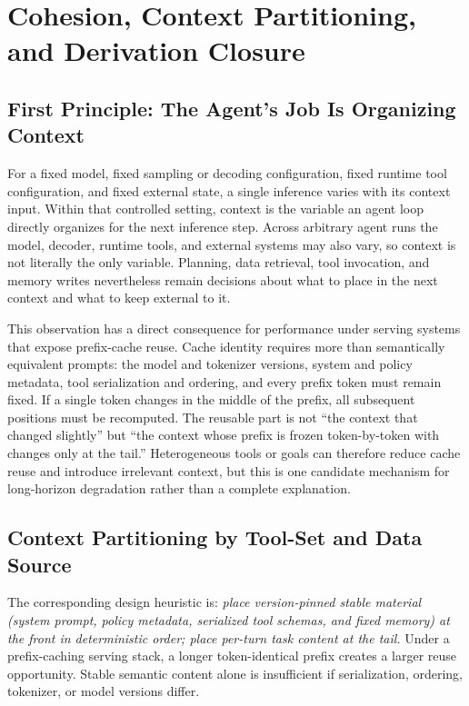 \section{Cohesion, Context Partitioning, and Derivation Closure}
\label{sec:cohesion}

\subsection{First Principle: The Agent's Job Is Organizing Context}
\label{sec:first-principle}

For a fixed model, fixed sampling or decoding configuration, fixed runtime tool configuration, and fixed external state, a single inference varies with its context input. Within that controlled setting, context is the variable an agent loop directly organizes for the next inference step. Across arbitrary agent runs the model, decoder, runtime tools, and external systems may also vary, so context is not literally the only variable. Planning, data retrieval, tool invocation, and memory writes nevertheless remain decisions about what to place in the next context and what to keep external to it.

This observation has a direct consequence for performance under serving systems that expose prefix-cache reuse. Cache identity requires more than semantically equivalent prompts: the model and tokenizer versions, system and policy metadata, tool serialization and ordering, and every prefix token must remain fixed. If a single token changes in the middle of the prefix, all subsequent positions must be recomputed. The reusable part is not ``the context that changed slightly'' but ``the context whose prefix is frozen token-by-token with changes only at the tail.'' Heterogeneous tools or goals can therefore reduce cache reuse and introduce irrelevant context, but this is one candidate mechanism for long-horizon degradation rather than a complete explanation.

\subsection{Context Partitioning by Tool-Set and Data Source}

The corresponding design heuristic is: \textit{place version-pinned stable material (system prompt, policy metadata, serialized tool schemas, and fixed memory) at the front in deterministic order; place per-turn task content at the tail.} Under a prefix-caching serving stack, a longer token-identical prefix creates a larger reuse opportunity. Stable semantic content alone is insufficient if serialization, ordering, tokenizer, or model versions differ.

